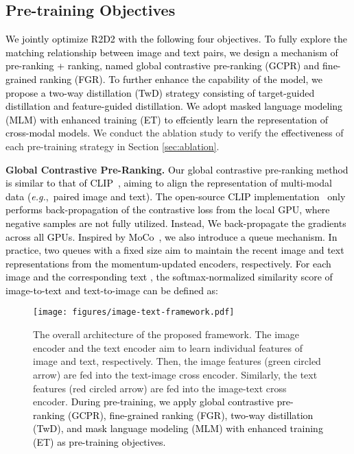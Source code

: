 \documentclass[sigconf]{acmart}
\def\eg{\mbox{\textit{e.g.}, }}
\def\mmxie{\textcolor{black}}
\def\mmljc{\textcolor{black}}
\def\mmcr{\textcolor{black}}
\begin{document}
\subsection{Pre-training Objectives}\label{sec Objectives}
\mmxie{We jointly optimize \mmcr{R2D2} with \mmljc{the following} four objectives.}
\mmcr{To fully explore the matching relationship between image and text pairs, we design a mechanism of pre-ranking + ranking, named global contrastive pre-ranking (GCPR) and fine-grained ranking (FGR). To further enhance the capability of the model, we propose a two-way distillation (TwD) strategy consisting of target-guided distillation and feature-guided distillation. We adopt masked language modeling (MLM) with enhanced training (ET) to effciently learn the representation of cross-modal models.}
We conduct the ablation study to verify the \mmljc{effectiveness} of each pre-training strategy in Section \ref{sec:ablation}.


\textbf{Global Contrastive Pre-Ranking.}
\mmxie{Our global contrastive pre-ranking method is similar to that of CLIP~\cite{CLIP}, aiming to align the representation of multi-modal data (\eg paired image and text). 
The open-source CLIP implementation~\cite{CLIP} only performs back-propagation of the contrastive loss from the local GPU, where negative samples are not fully utilized. Instead, We back-propagate the gradients across all  GPUs. Inspired by MoCo~\cite{moco}, we also introduce a queue mechanism. In practice, two queues with a fixed size  aim to maintain the recent image and text representations from the momentum-updated encoders, respectively.  
For each image  and the corresponding text , the softmax-normalized similarity score of image-to-text and text-to-image can be defined as:}



\begin{figure*}[t]
    \centering
	\texttt{[image: figures/image-text-framework.pdf]}
	\caption{The overall architecture of the proposed framework. The image encoder and the text encoder aim to learn individual features of image and text, respectively. Then, the image features (green circled arrow) are fed into the text-image cross encoder. Similarly, the text features (red circled arrow) are fed into the image-text cross encoder. 
\mmcr{During pre-training, we apply global contrastive pre-ranking (GCPR), fine-grained ranking (FGR), two-way distillation (TwD), and mask language modeling (MLM) with enhanced training (ET) as pre-training objectives.}
    }
	\label{fig:framework}
\end{figure*}
\end{document}

